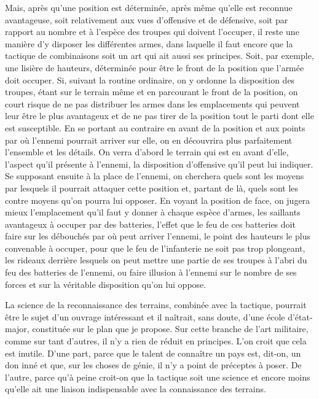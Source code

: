 \documentclass[french,twoside]{book} %
\begin{document}
Mais, après qu’une position est déterminée, après même qu’elle est reconnue avantageuse, soit relativement aux vues d’offensive et de défensive, soit par rapport au nombre et à l’espèce des troupes qui doivent l’occuper, il reste une manière d’y disposer les différentes armes, dans laquelle il faut encore que la tactique de combinaisons soit un art qui ait aussi ses principes. Soit, par exemple, une lisière de hauteurs, déterminée pour être le front de la position que l’armée doit occuper. Si, suivant la routine ordinaire, on y ordonne la disposition des troupes, étant sur le terrain même et en parcourant le front de la position, on court risque de ne pas distribuer les armes dans les emplacements qui peuvent leur être le plus avantageux et de ne pas tirer de la position tout le parti dont elle est susceptible. En se portant au contraire en avant de la position et aux points par où l’ennemi pourrait arriver sur elle, on en découvrira plus parfaitement l’ensemble et les détails. On verra d’abord le terrain qui est en avant d’elle, l’aspect qu’il présente à l’ennemi, la disposition d’offensive qu’il peut lui indiquer. Se supposant ensuite à la place de l’ennemi, on cherchera quels sont les moyens par lesquels il pourrait attaquer cette position et, partant de là, quels sont les contre moyens qu’on pourra lui opposer. En voyant la position de face, on jugera mieux l’emplacement qu’il faut y donner à chaque espèce d’armes, les saillants avantageux à occuper par des batteries, l’effet que le feu de ces batteries doit faire sur les débouchés par où peut arriver l’ennemi, le point des hauteurs le plus convenable à occuper, pour que le feu de l’infanterie ne soit pas trop plongeant, les rideaux derrière lesquels on peut mettre une partie de ses troupes à l’abri du feu des batteries de l’ennemi, ou faire illusion à l’ennemi sur le nombre de ses forces et sur la véritable disposition qu’on lui oppose.\par
La science de la reconnaissance des terrains, combinée avec la tactique, pourrait être le sujet d’un ouvrage intéressant et il naîtrait, sans doute, d’une école d’état-major, constituée sur le plan que je propose. Sur cette branche de l’art militaire, comme sur tant d’autres, il n’y a rien de réduit en principes. L’on croit que cela est inutile. D’une part, parce que le talent de connaître un pays est, dit-on, un don inné et que, sur les choses de génie, il n’y a point de préceptes à poser. De l’autre, parce qu’à peine croit-on que la tactique soit une science et encore moins qu’elle ait une liaison indispensable avec la connaissance des terrains.\par
\end{document}
